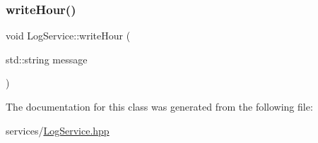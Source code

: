 \subsubsection{\texorpdfstring{write\+Hour()}{writeHour()}}
{\footnotesize\ttfamily void Log\+Service\+::write\+Hour (\begin{DoxyParamCaption}\item[{std\+::string}]{message }\end{DoxyParamCaption})\hspace{0.3cm}{\ttfamily [inline]}}



The documentation for this class was generated from the following file\+:\begin{DoxyCompactItemize}
\item 
services/\mbox{\hyperlink{LogService_8hpp}{Log\+Service.\+hpp}}\end{DoxyCompactItemize}
